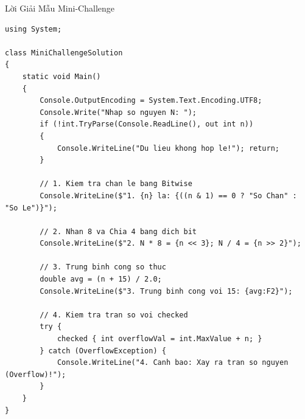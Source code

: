 \documentclass[aspectratio=169, 10pt]{beamer}
\begin{document}
\begin{frame}[fragile]{Lời Giải Mẫu Mini-Challenge}
\begin{lstlisting}
using System;

class MiniChallengeSolution
{
    static void Main()
    {
        Console.OutputEncoding = System.Text.Encoding.UTF8;
        Console.Write("Nhap so nguyen N: ");
        if (!int.TryParse(Console.ReadLine(), out int n))
        {
            Console.WriteLine("Du lieu khong hop le!"); return;
        }

        // 1. Kiem tra chan le bang Bitwise
        Console.WriteLine($"1. {n} la: {((n & 1) == 0 ? "So Chan" : "So Le")}");

        // 2. Nhan 8 va Chia 4 bang dich bit
        Console.WriteLine($"2. N * 8 = {n << 3}; N / 4 = {n >> 2}");

        // 3. Trung binh cong so thuc
        double avg = (n + 15) / 2.0;
        Console.WriteLine($"3. Trung binh cong voi 15: {avg:F2}");

        // 4. Kiem tra tran so voi checked
        try {
            checked { int overflowVal = int.MaxValue + n; }
        } catch (OverflowException) {
            Console.WriteLine("4. Canh bao: Xay ra tran so nguyen (Overflow)!");
        }
    }
}
\end{lstlisting}
\end{frame}
\end{document}
